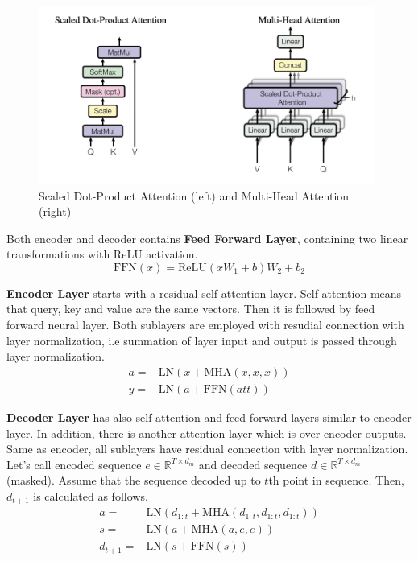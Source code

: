 \begin{figure}
	\centering
	\includegraphics[width=0.98\textwidth]{figures/ml_theory/att.png}
	\caption{Scaled Dot-Product Attention (left) and Multi-Head Attention (right)~\cite{vaswani_attention_2017}}
	\label{fig:att_and_mha}
\end{figure}

Both encoder and decoder contains \textbf{Feed Forward Layer}, containing two linear transformations with ReLU activation.
\begin{equation}
\mathrm{FFN}(x) = \text{ReLU}(xW_1+b)W_2+b_2
\end{equation}

\textbf{Encoder Layer} starts with a residual self attention layer. 
Self attention means that query, key and value are the same vectors. 
Then it is followed by feed forward neural layer. 
Both sublayers are employed with resudial connection with layer normalization, 
i.e summation of layer input and output is passed through layer normalization. 
\begin{equation}
\begin{split}
a = & \mathrm{LN}(x + \mathrm{MHA}(x,x,x)) \\
y = & \mathrm{LN}(a + \mathrm{FFN}(att))
\end{split}
\end{equation}

\textbf{Decoder Layer} has also self-attention and feed forward layers similar to encoder layer. 
In addition, there is another attention layer which is over encoder outputs. 
Same as encoder, all sublayers have residual connection with layer normalization. 
Let's call encoded sequence $e \in \mathbb{R}^{T \times d_m}$ and decoded sequence $d \in \mathbb{R}^{T \times d_m}$ (masked). 
Assume that the sequence decoded up to $t$th point in sequence. 
Then, $d_{t+1}$ is calculated as follows. 
\begin{equation}
\begin{split}
a = & \mathrm{LN}(d_{1:t}+\mathrm{MHA}(d_{1:t},d_{1:t},d_{1:t})) \\
s = & \mathrm{LN}(a + \mathrm{MHA}(a,e,e)) \\
d_{t+1} = & \mathrm{LN}(s+ \mathrm{FFN}(s))
\end{split}
\end{equation}

